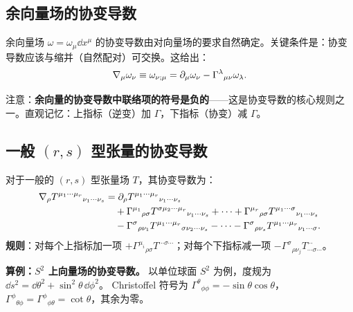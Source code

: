 \subsection{余向量场的协变导数}

余向量场 $\omega = \omega_\mu \dd x^\mu$ 的协变导数由对向量场的要求自然确定。关键条件是：协变导数应该与缩并（自然配对）可交换。这给出：
\begin{equation}
    \nabla_\mu \omega_\nu \equiv \omega_{\nu;\mu} = \partial_\mu \omega_\nu - \Gamma^\lambda{}_{\mu\nu} \omega_\lambda.
\end{equation}

注意：\textbf{余向量的协变导数中联络项的符号是负的}——这是协变导数的核心规则之一。直观记忆：上指标（逆变）加 $\Gamma$，下指标（协变）减 $\Gamma$。

\subsection{一般 $(r,s)$ 型张量的协变导数}

\begin{property}[张量的协变导数]
对于一般的 $(r,s)$ 型张量场 $T$，其协变导数为：
\begin{equation}
    \begin{aligned}
    \nabla_\rho T^{\mu_1\cdots\mu_r}{}_{\nu_1\cdots\nu_s}
    &= \partial_\rho T^{\mu_1\cdots\mu_r}{}_{\nu_1\cdots\nu_s} \\
    &\quad + \Gamma^{\mu_1}{}_{\rho\sigma} T^{\sigma\mu_2\cdots\mu_r}{}_{\nu_1\cdots\nu_s} + \cdots + \Gamma^{\mu_r}{}_{\rho\sigma} T^{\mu_1\cdots\sigma}{}_{\nu_1\cdots\nu_s} \\
    &\quad - \Gamma^\sigma{}_{\rho\nu_1} T^{\mu_1\cdots\mu_r}{}_{\sigma\nu_2\cdots\nu_s} - \cdots - \Gamma^\sigma{}_{\rho\nu_s} T^{\mu_1\cdots\mu_r}{}_{\nu_1\cdots\sigma}.
    \end{aligned}
\end{equation}
\textbf{规则}：对每个上指标加一项 $+\Gamma^{\mu_i}{}_{\rho\sigma} T^{\cdots\sigma\cdots}$；对每个下指标减一项 $-\Gamma^\sigma{}_{\rho\nu_j} T^{\cdots}_{\cdots\sigma\cdots}$。
\end{property}

\medskip
\noindent\textbf{算例：$S^2$ 上向量场的协变导数。}\quad
以单位球面 $S^2$ 为例，度规为 $\dd s^2 = \dd\theta^2 + \sin^2\theta\,\dd\phi^2$。
Christoffel 符号为 $\Gamma^\theta{}_{\phi\phi} = -\sin\theta\cos\theta$，$\Gamma^\phi{}_{\theta\phi} = \Gamma^\phi{}_{\phi\theta} = \cot\theta$，其余为零。


